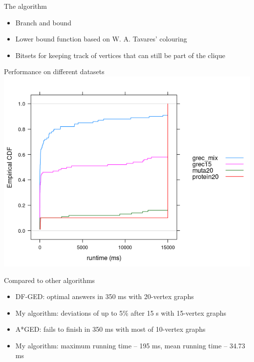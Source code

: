 \documentclass{beamer}
\begin{document}
\begin{frame}{The algorithm}
  \begin{itemize}
  \item Branch and bound
  \item Lower bound function based on W. A. Tavares' colouring \cite{DBLP:phd/hal/tavares16}
  \item Bitsets for keeping track of vertices that can still be part of the clique
  \end{itemize}
\end{frame}
\begin{frame}{Performance on different datasets}
  \includegraphics[scale=0.6]{../ecdfs.png}
\end{frame}
\begin{frame}{Compared to other algorithms \cite{DBLP:conf/icpram/Abu-AishehRRM15}}
  \begin{itemize}
  \item DF-GED: optimal answers in 350 ms with 20-vertex graphs
  \item My algorithm: deviations of up to 5\% after 15 s with 15-vertex graphs
  \end{itemize}
  \begin{itemize}
  \item A*GED: fails to finish in 350 ms with most of 10-vertex graphs
  \item My algorithm: maximum running time -- 195 ms, mean running time -- 34.73 ms
  \end{itemize}
\end{frame}
\end{document}

